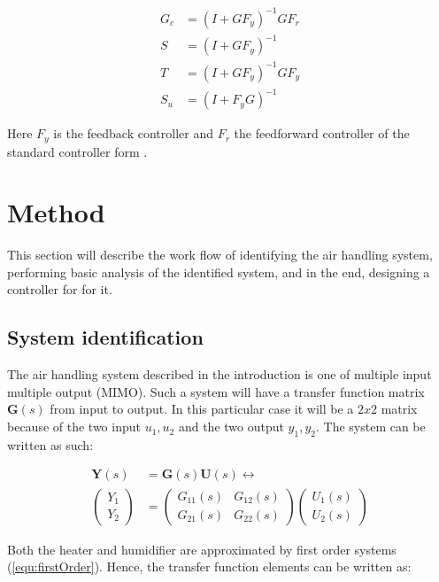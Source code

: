 \documentclass[a4paper, titlepage]{article}
\begin{document}
\begin{equation}
\begin{split}
G_c &= (I + GF_y)^{-1}GF_r \\
S &= (I + GF_y)^{-1} \\
T &= (I + GF_y)^{-1}GF_y \\
S_u &= (I + F_yG)^{-1}
\end{split}
\label{equ:transFunc}
\end{equation}

Here $F_y$ is the feedback controller and $F_r$ the feedforward controller of the standard controller form \citep[p.~147]{glad00}.

\section{Method}
This section will describe the work flow of identifying the air handling system, performing basic analysis of the identified system, and in the end, designing a controller for for it.

\subsection{System identification}
The air handling system described in the introduction is one of multiple input multiple output (MIMO).
Such a system will have a transfer function matrix $\boldsymbol{G}(s)$ from input to output. In this particular case it will be a $2x2$ matrix because of the two input $u_1, u_2$ and the two output $y_1, y_2$.
The system can be written as such:

\begin{equation}
\begin{split}
\boldsymbol{Y}(s) &= \boldsymbol{G}(s)\boldsymbol{U}(s) \leftrightarrow \\
\begin{pmatrix}
Y_1 \\ Y_2
\end{pmatrix}
&=
\begin{pmatrix}
G_{11}(s) & G_{12}(s) \\ G_{21}(s) & G_{22}(s)
\end{pmatrix}
\begin{pmatrix}
U_1(s) \\ U_2(s)
\end{pmatrix}
\end{split}
\end{equation}

Both the heater and humidifier are approximated by first order systems (\ref{equ:firstOrder}).
Hence, the transfer function elements can be written as:
\end{document}
